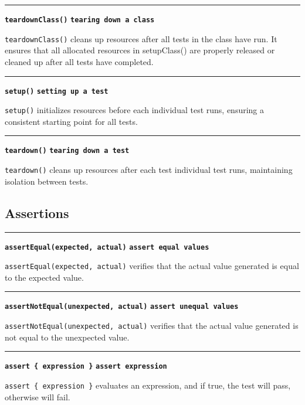 \documentclass[letterpaper,12pt]{article}
\begin{document}
\bigskip
\hrule\vspace{0.1cm}
\noindent
{\tt\bf teardownClass()} \hfill {\tt\bf tearing down a class}

\vspace{0.1cm}
\noindent
\texttt{teardownClass()} cleans up resources after all tests in the class have run. It ensures that all allocated resources in setupClass() are properly released or cleaned up after all tests have completed.

\bigskip
\hrule\vspace{0.1cm}
\noindent
{\tt\bf setup()} \hfill {\tt\bf setting up a test}

\vspace{0.1cm}
\noindent
\texttt{setup()} initializes resources before each individual test runs, ensuring a consistent starting point for all tests.

\bigskip
\hrule\vspace{0.1cm}
\noindent
{\tt\bf teardown()} \hfill {\tt\bf tearing down a test}

\vspace{0.1cm}
\noindent
\texttt{teardown()} cleans up resources after each test individual test runs, maintaining isolation between tests.

\newpage\subsection{Assertions}

\bigskip
\hrule\vspace{0.1cm}
\noindent
{\tt\bf assertEqual(expected, actual)} \hfill {\tt\bf assert equal values}

\vspace{0.1cm}
\noindent
\texttt{assertEqual(expected, actual)} verifies that the actual value generated is equal to the expected value.

\bigskip
\hrule\vspace{0.1cm}
\noindent
{\tt\bf assertNotEqual(unexpected, actual)} \hfill {\tt\bf assert unequal values}

\vspace{0.1cm}
\noindent
\texttt{assertNotEqual(unexpected, actual)} verifies that the actual value generated is not equal to the unexpected value.

\bigskip
\hrule\vspace{0.1cm}
\noindent
{\tt\bf assert \{ expression \}} \hfill {\tt\bf assert expression}

\vspace{0.1cm}
\noindent
\texttt{assert \{ expression \}} evaluates an expression, and if true, the test will pass, otherwise will fail.
\end{document}
